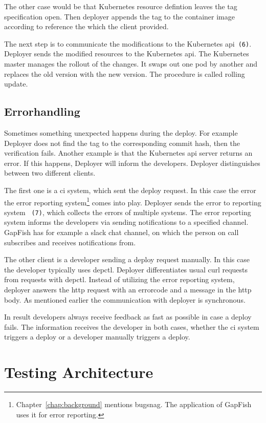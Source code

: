 The other case would be that Kubernetes resource defintion leaves the tag specification
open. Then deployer appends the tag to the container image according to reference the
which the client provided.

The next step is to communicate the modifications to the Kubernetes
api~\texttt{(6)}. Deployer sends the modified resources to the Kubernetes api. The
Kubernetes master manages the rollout of the changes. It swaps out one pod by another and
replaces the old version with the new version. The procedure is called rolling update.

\subsection{Errorhandling}

Sometimes something unexpected happens during the deploy. For example Deployer does not
find the tag to the corresponding commit hash, then the verification fails. Another
example is that the Kubernetes api server returns an error. If this happens, Deployer will
inform the developers. Deployer distinguishes between two different clients.

The first one is a \gls{ci} system, which sent the deploy request. In this case the error
the error reporting system\footnote{Chapter~\ref{chap:background} mentions bugsnag. The
  application of GapFish uses it for error reporting.} comes into play. Deployer sends the
error to reporting system ~\texttt{(7)}, which collects the errors of multiple
systems. The error reporting system informs the developers via sending notifications to a
specified channel. GapFish has for example a slack chat channel, on which the person on
call subscribes and receives notifications from.

The other client is a developer sending a deploy request manually. In this case the
developer typically uses depctl. Deployer differentiates usual curl requests from requests
with depctl. Instead of utilizing the error reporting system, deployer answers the http
request with an errorcode and a message in the http body. As mentioned earlier the
communication with deployer is synchronous.

In result developers always receive feedback as fast as possible in case a deploy
fails. The information receives the developer in both cases, whether the \gls{ci} system
triggers a deploy or a developer manually triggers a deploy.

\section{Testing Architecture}
\label{test_architecture}

